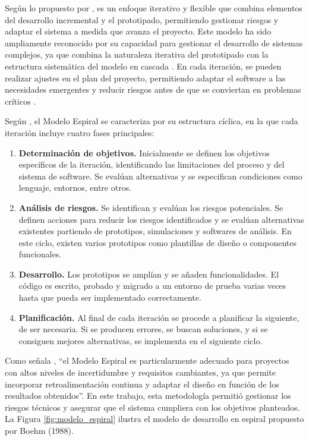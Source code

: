 Según lo propuesto por \citeauthor{boehm_spiral_1988} \citeyear{boehm_spiral_1988}, es un enfoque iterativo y flexible que combina elementos del desarrollo incremental y el prototipado, permitiendo gestionar riesgos y adaptar el sistema a medida que avanza el proyecto. Este modelo ha sido ampliamente reconocido por su capacidad para gestionar el desarrollo de sistemas complejos, ya que combina la naturaleza iterativa del prototipado con la estructura sistemática del modelo en cascada \cite[p. 39]{pressman_ingenieria_2010}. En cada iteración, se pueden realizar ajustes en el plan del proyecto, permitiendo adaptar el software a las necesidades emergentes y reducir riesgos antes de que se conviertan en problemas críticos \cite[p. 40]{pressman_ingenieria_2010}.

Según \citeauthor{boehm_spiral_1988} \citeyear{boehm_spiral_1988}, el Modelo Espiral se caracteriza por su estructura cíclica, en la que cada iteración incluye cuatro fases principales:

\begin{enumerate}
  \item \textbf{Determinación de objetivos.} Inicialmente se definen los objetivos específicos de la iteración, identificando las limitaciones del proceso y del sistema de software. Se evalúan alternativas y se especifican condiciones como lenguaje, entornos, entre otros.
  \item \textbf{Análisis de riesgos.} Se identifican y evalúan los riesgos potenciales. Se definen acciones para reducir los riesgos identificados y se evalúan alternativas existentes partiendo de prototipos, simulaciones y softwares de análisis. En este ciclo, existen varios prototipos como plantillas de diseño o componentes funcionales.
  \item \textbf{Desarrollo.} Los prototipos se amplían y se añaden funcionalidades. El código es escrito, probado y migrado a un entorno de prueba varias veces hasta que pueda ser implementado correctamente.
  \item \textbf{Planificación.} Al final de cada iteración se procede a planificar la siguiente, de ser necesaria. Si se producen errores, se buscan soluciones, y si se consiguen mejores alternativas, se implementa en el siguiente ciclo.
\end{enumerate}

Como señala \citeauthor{boehm_spiral_1988} \citeyear{boehm_spiral_1988}, ``el Modelo Espiral es particularmente adecuado para proyectos con altos niveles de incertidumbre y requisitos cambiantes, ya que permite incorporar retroalimentación continua y adaptar el diseño en función de los resultados obtenidos”. En este trabajo, esta metodología permitió gestionar los riesgos técnicos y asegurar que el sistema cumpliera con los objetivos planteados. La Figura \ref{fig:modelo_espiral} ilustra el modelo de desarrollo en espiral propuesto por Boehm (1988).

